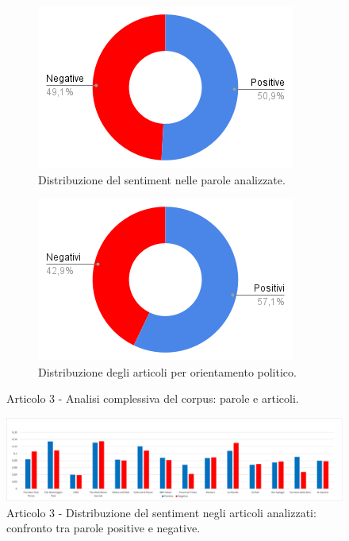 \begin{figure}[H]
    \centering
    \begin{subfigure}[t]{0.48\textwidth}
        \centering
        \includegraphics[width=\linewidth]{Immagini//Articolo3/Articolo 3 - Rapporto Totale Parole.png}
        \caption{Distribuzione del sentiment nelle parole analizzate.}
        \label{fig:totale-parole-a3}
    \end{subfigure}
    \hfill
    \begin{subfigure}[t]{0.48\textwidth}
        \centering
        \includegraphics[width=\linewidth]{Immagini//Articolo3/Articolo 3 - Rapporto Totale Articoli.png}
        \caption{Distribuzione degli articoli per orientamento politico.}
        \label{fig:totale-articoli-a3}
    \end{subfigure}
    \caption{Articolo 3 - Analisi complessiva del corpus: parole e articoli.}
    \label{fig:analisi-totale-a3}

    \centering
    \includegraphics[width=1\linewidth]{Immagini//Articolo3/Articolo 3 - Analisi Grafica Risultati Totali.png}
    \caption{Articolo 3 - Distribuzione del sentiment negli articoli analizzati: confronto tra parole positive e negative.}
    \label{fig:risultati-totali-a3}
\end{figure}
